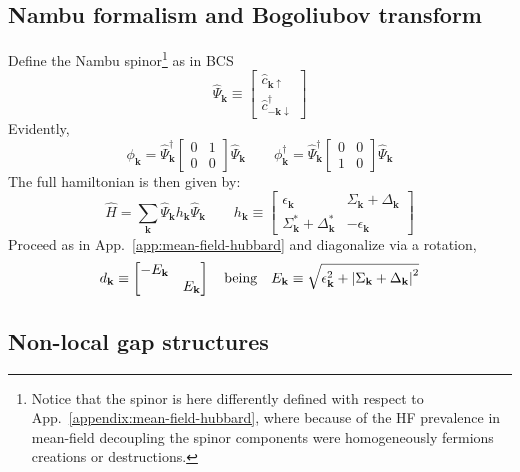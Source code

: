\subsection{Nambu formalism and Bogoliubov transform}

Define the Nambu spinor\footnote{
	Notice that the spinor is here differently defined with respect to App.~\ref{appendix:mean-field-hubbard}, where because of the HF prevalence in mean-field decoupling the spinor components were homogeneously fermions creations or destructions.
} as in BCS
\[
	\hat \Psi_\mathbf{k} \equiv \begin{bmatrix}
		\hat c_{\mathbf{k}\uparrow} \\
		\hat c_{-\mathbf{k}\downarrow}^\dagger
	\end{bmatrix}
\]
Evidently,
\[
	\phi_\mathbf{k} = \hat \Psi_\mathbf{k}^\dagger \begin{bmatrix}
		0 & 1 \\ 0 & 0
	\end{bmatrix} \hat \Psi_\mathbf{k}
	\qquad
	\phi_\mathbf{k}^\dagger = \hat \Psi_\mathbf{k}^\dagger \begin{bmatrix}
		0 & 0 \\ 1 & 0
	\end{bmatrix} \hat \Psi_\mathbf{k}
\]
The full hamiltonian is then given by:
\begin{equation}\label{eq:extended-hubbard-hamiltonian-nambu-bogoliubov}
	\hat H = \sum_\mathbf{k} \hat \Psi_\mathbf{k} h_\mathbf{k} \hat \Psi_\mathbf{k}
	\qquad
	h_\mathbf{k} \equiv \begin{bmatrix}
		\epsilon_\mathbf{k} & \Sigma_\mathbf{k} + \Delta_\mathbf{k} \\
		\Sigma_\mathbf{k}^* + \Delta_\mathbf{k}^* & - \epsilon_\mathbf{k}
	\end{bmatrix}
\end{equation}
Proceed as in App.~\ref{app:mean-field-hubbard} and diagonalize via a rotation,
\[
	d_\mathbf{k} \equiv \begin{bmatrix}
		-E_\mathbf{k} & \\ & E_\mathbf{k}
	\end{bmatrix}
	\qq{being}
	E_\mathbf{k} \equiv \sqrt{\epsilon_\mathbf{k}^2 + \abs{\Sigma_\mathbf{k} + \Delta_\mathbf{k}}^2}
\]

\subsection{Non-local gap structures}

